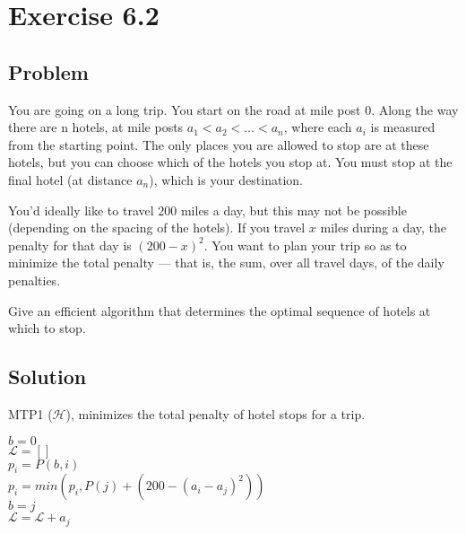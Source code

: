 \documentclass[12pt, letterpaper]{article}
\begin{document}
\section{Exercise 6.2}

\subsection{Problem}

You are going on a long trip. You start on the road at mile post \(0\). Along the way there are n hotels, at mile posts \(a_1 < a_2 < \dots < a_n\), where each \(a_i\) is measured from the starting point. The only places you are allowed to stop are at these hotels, but you can choose which of the hotels you stop at. You must stop at the final hotel (at distance \(a_n\)), which is your destination.

\par
You'd ideally like to travel \(200\) miles a day, but this may not be possible (depending on the spacing of the hotels). If you travel \(x\) miles during a day, the penalty for that day is \((200 - x)^2\). You want to plan your trip so as to minimize the total penalty --- that is, the sum, over all travel days, of the daily penalties.

\par
Give an efficient algorithm that determines the optimal sequence of hotels at which to stop.

\subsection{Solution}

\begin{algorithm}
    \caption{MTP1 (\(\mathcal{H}\)), minimizes the total penalty of hotel stops for a trip.}
    \(b = 0\) \\
    \(\mathcal{L} = []\) \\
    {
        \(p_i = P(b,i)\) \\
        {
            \(p_i = min(p_i, P(j) + (200 - (a_i - a_j)^2))\) \\
             {
                \(b = j\) \\
                \(\mathcal{L} = \mathcal{L} + a_j\) \\
            }
        }
    }
\end{algorithm}
\end{document}
